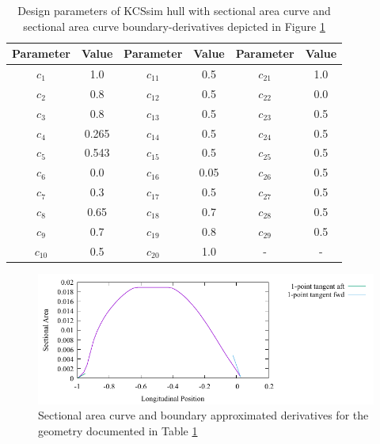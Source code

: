 \documentclass{report}
\begin{document}
\begin{table}[H]
    \centering
    \begin{tabular}{|c|c|c|c|c|c|}
        \hline 
        Parameter & Value & Parameter & Value & Parameter & Value\\
        \hline 
        $c_1$ & 1.0 & $c_{11}$ & 0.5 & $c_{21}$ & 1.0 \\
        \hline 
        $c_2$ & 0.8 & $c_{12}$ & 0.5 & $c_{22}$ & 0.0\\
        \hline 
        $c_3$ & 0.8 & $c_{13}$ & 0.5 & $c_{23}$ & 0.5 \\
        \hline 
        $c_4$ & 0.265 & $c_{14}$ & 0.5 & $c_{24}$ & 0.5 \\
        \hline 
        $c_5$ & 0.543 & $c_{15}$ & 0.5 & $c_{25}$ & 0.5 \\
        \hline 
        $c_6$ & 0.0 & $c_{16}$ & 0.05 & $c_{26}$ & 0.5 \\
        \hline 
        $c_7$ & 0.3 & $c_{17}$ & 0.5 & $c_{27}$ & 0.5 \\
        \hline 
        $c_8$ & 0.65 & $c_{18}$ & 0.7 & $c_{28}$ & 0.5 \\
        \hline 
        $c_9$ & 0.7 & $c_{19}$ & 0.8 & $c_{29}$ & 0.5 \\
        \hline 
        $c_{10}$ & 0.5 & $c_{20}$ & 1.0 & - & - \\
        \hline 
    \end{tabular}
    \caption{Design parameters of KCSsim hull with sectional area curve and 
    sectional area curve boundary-derivatives depicted in Figure
    \ref{fig:test-4-sac-1}}
    \label{tab:test-4-1}
\end{table}
\begin{figure}[H]
    \centering
    \includegraphics[width = 0.7\linewidth]{figures/test-4-sac-1.pdf}
    \caption{Sectional area curve and boundary approximated derivatives for
    the geometry documented in Table \ref{tab:test-4-1}}
    \label{fig:test-4-sac-1}
\end{figure}
\end{document}
